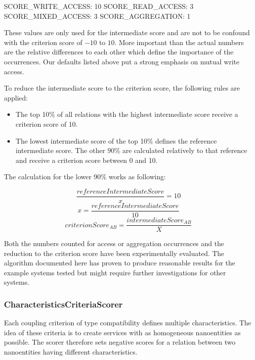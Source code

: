 SCORE\_WRITE\_ACCESS: 10 \newline
SCORE\_READ\_ACCESS: 3  \newline
SCORE\_MIXED\_ACCESS: 3 \newline 
SCORE\_AGGREGATION: 1 \newline 

These values are only used for the intermediate score and are not to be confound with the criterion score of $-10$ to $10$. More important than the actual numbers are the relative differences to each other which define the importance of the occurrences. Our defaults listed above put a strong emphasis on mutual write access. 

To reduce the intermediate score to the criterion score, the following rules are applied:

\begin{itemize}
	\item The top 10\% of all relations with the highest intermediate score receive a criterion score of 10.
	\item The lowest intermediate score of the top 10\% defines the reference intermediate score. The other 90\% are calculated relatively to that reference and receive a criterion score between 0 and 10.
\end{itemize}

The calculation for the lower 90\% works as following:


\begin{equation}
\frac{referenceIntermediateScore}{x} = 10
\end{equation}
\begin{equation}
x = \frac{referenceIntermediateScore}{10}
\end{equation}
\begin{equation}
criterionScore_{AB} = \frac{intermediateScore_{AB}}{X}
\end{equation}

Both the numbers counted for access or aggregation occurrences and the reduction to the criterion score have been experimentally evaluated. The algorithm documented here has proven to produce reasonable results for the example systems tested but might require further investigations for other systems. 

\subsubsection{CharacteristicsCriteriaScorer}

Each coupling criterion of type compatibility defines multiple characteristics. The idea of these criteria is to create services with as homogeneous nanoentities as possible. The scorer therefore sets negative scores for a relation between two nanoentities having different characteristics. 

